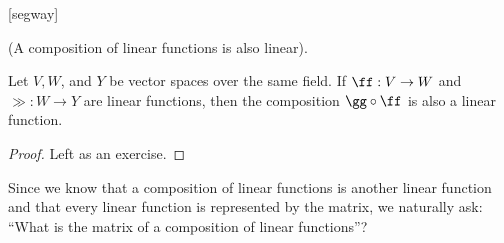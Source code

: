 [segway]

\begin{theorem}
    (A composition of linear functions is also linear).
    
    Let $V, W$, and $Y$ be vector spaces over the same field. If $\ff:V \rightarrow W$ and $\gg:W \rightarrow Y$ are linear functions, then the composition $\gg \circ \ff$ is also a linear function.
\end{theorem}

\begin{proof}
   Left as an exercise.
\end{proof}

Since we know that a composition of linear functions is another linear function and that every linear function is represented by the matrix, we naturally ask: ``What is the matrix of a composition of linear functions''?


